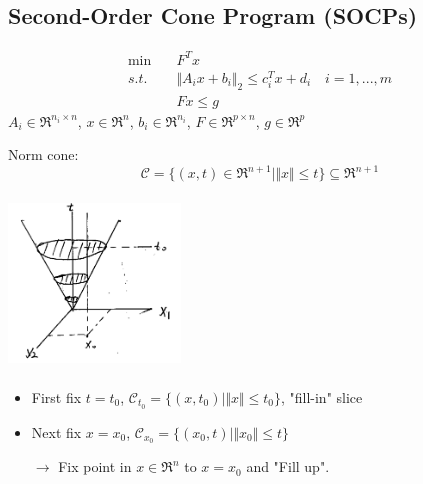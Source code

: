 
\subsection{Second-Order Cone Program (SOCPs)}

\begin{align*}
\min \quad&F^Tx\\
s.t. \quad& \Vert A_ix+b_i\Vert_2 \leq c_i^Tx + d_i\quad i = 1,...,m\\
&Fx \leq g
\end{align*}
$A_i\in \Re^{n_i\times n}$, $x\in \Re^n$, $b_i\in \Re^{n_i}$, $F\in \Re^{p\times n}$, $g\in \Re^p$

Norm cone:
\begin{equation*}
\mathcal{C} = \{(x,t)\in \Re^{n+ 1} \vert \Vert x\Vert \leq t \} \subseteq \Re^{n+1}
\end{equation*}


\begin{marginfigure}
\centering
\includegraphics[width=1.8in,height=1.8in]{figures/ch09/figure1118_1.png}
\end{marginfigure}

\begin{itemize}
	\item First fix $t = t_0$, $\mathcal{C}_{t_0} = \{(x,t_0)\vert \Vert x\Vert \leq t_0 \}$, "fill-in" slice
	
	\item Next fix $x = x_0$, $\mathcal{C}_{x_0} = \{(x_0,t)\vert \Vert x_0\Vert \leq t \}$
	
	$\rightarrow$  Fix point in $x\in \Re^n$ to $x = x_0$ and "Fill up".
\end{itemize}


